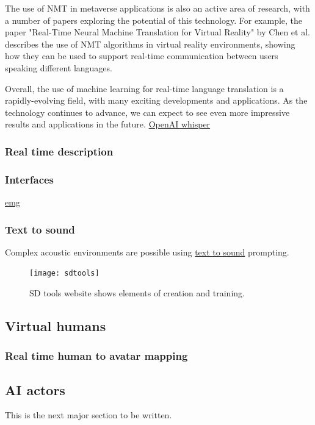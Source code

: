 The use of NMT in metaverse applications is also an active area of research, with a number of papers exploring the potential of this technology. For example, the paper "Real-Time Neural Machine Translation for Virtual Reality" by Chen et al. describes the use of NMT algorithms in virtual reality environments, showing how they can be used to support real-time communication between users speaking different languages.\par
Overall, the use of machine learning for real-time language translation is a rapidly-evolving field, with many exciting developments and applications. As the technology continues to advance, we can expect to see even more impressive results and applications in the future.
\href{https://openai.com/blog/whisper/}{OpenAI whisper}

\subsubsection{Real time description}
\subsubsection{Interfaces}
\href{https://tech.fb.com/ar-vr/2021/03/inside-facebook-reality-labs-wrist-based-interaction-for-the-next-computing-platform/}{emg}
\subsubsection{Text to sound}
Complex acoustic environments are possible using \href{https://anonymous.4open.science/w/iclr2023_samples-CB68/report.html}{text to sound} prompting. 

\begin{figure}
  \centering
    \texttt{[image: sdtools]}
  \caption{SD tools website shows elements of creation and training.}
  	\label{fig:SDTools}
\end{figure}
\subsection{Virtual humans}
\subsubsection{Real time human to avatar mapping}
\subsection{AI actors}
This is the next major section to be written.
